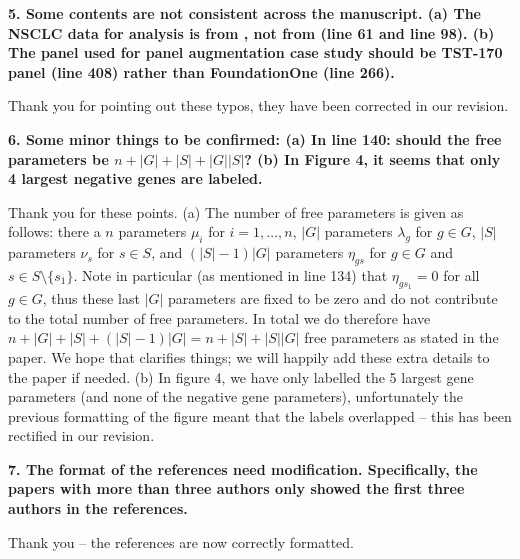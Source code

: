 \documentclass[12pt]{article}
\begin{document}
\textbf{5. Some contents are not consistent across the manuscript.
(a) The NSCLC data for analysis is from \citet{campbell_distinct_2016}, not from \citet{chalmers_analysis_2017} (line 61 and line 98).
(b) The panel used for panel augmentation case study should be TST-170 panel (line 408) rather than FoundationOne (line 266).}

Thank you for pointing out these typos, they have been corrected in our revision. 

\textbf{6. Some minor things to be confirmed:
(a) In line 140: should the free parameters be $n + |G| + |S| + |G||S|$?
(b) In Figure 4, it seems that only 4 largest negative genes are labeled.}

Thank you for these points. (a) The number of free parameters is given as follows: there a $n$ parameters $\mu_i$ for $i = 1, \ldots, n$, $|G|$ parameters $\lambda_g$ for $g \in G$, $|S|$ parameters $\nu_s$ for $s \in S$, and $(|S| - 1) |G|$ parameters $\eta_{gs}$ for $g \in G$ and $s \in S \setminus \{s_1\}$. Note in particular (as mentioned in line 134) that $\eta_{gs_1} = 0$ for all $g \in G$, thus these last $|G|$ parameters are fixed to be zero and do not contribute to the total number of free parameters. In total we do therefore have $n + |G| + |S| + (|S|-1)|G| = n + |S| + |S||G|$ free parameters as stated in the paper.  We hope that clarifies things; we will happily add these extra details to the paper if needed. (b) In figure 4, we have only labelled the 5 largest gene parameters (and none of the negative gene parameters), unfortunately the previous formatting of the figure meant that the labels overlapped -- this has been rectified in our revision. 

\textbf{7. The format of the references need modification. Specifically, the papers with more than three authors only showed the first three authors in the references.}

Thank you -- the references are now correctly formatted. 
\end{document}
